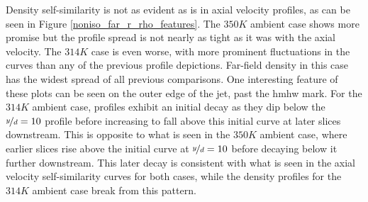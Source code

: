 Density self-similarity is not as evident as is in axial velocity profiles, as can be seen in Figure \ref{noniso_far_r_rho_features}. The $350 K$ ambient case shows more promise but the profile spread is not nearly as tight as it was with the axial velocity. The $314 K$ case is even worse, with more prominent fluctuations in the curves than any of the previous profile depictions. Far-field density in this case has the widest spread of all previous comparisons. One interesting feature of these plots can be seen on the outer edge of the jet, past the \gls{hmhw} mark. For the $314 K$ ambient case, profiles exhibit an initial decay as they dip below the $\nicefrac{y}{d}=10$ profile before increasing to fall above this initial curve at later slices downstream. This is opposite to what is seen in the $350 K$ ambient case, where earlier slices rise above the initial curve at $\nicefrac{y}{d} = 10$ before decaying below it further downstream. This later decay is consistent with what is seen in the axial velocity self-similarity curves for both cases, while the density profiles for the $314 K$ ambient case break from this pattern. 
